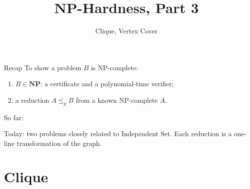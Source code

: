 \documentclass[10pt,aspectratio=169]{beamer}
\title{NP-Hardness, Part 3}
\subtitle{Clique, Vertex Cover}
\date{}
\author{}
\begin{document}
\maketitle

\begin{frame}{Recap}
  To show a problem $B$ is NP-complete:
  \begin{enumerate}
    \item $B \in \mathbf{NP}$: a certificate and a polynomial-time verifier;
    \item a reduction $A \le_p B$ from a known NP-complete $A$.
  \end{enumerate}

  \bigskip
  So far:
  \begin{center}
  \end{center}

  \bigskip
  Today: two problems closely related to Independent Set. Each reduction is
  a one-line transformation of the graph.
\end{frame}

\section{Clique}
\end{document}
